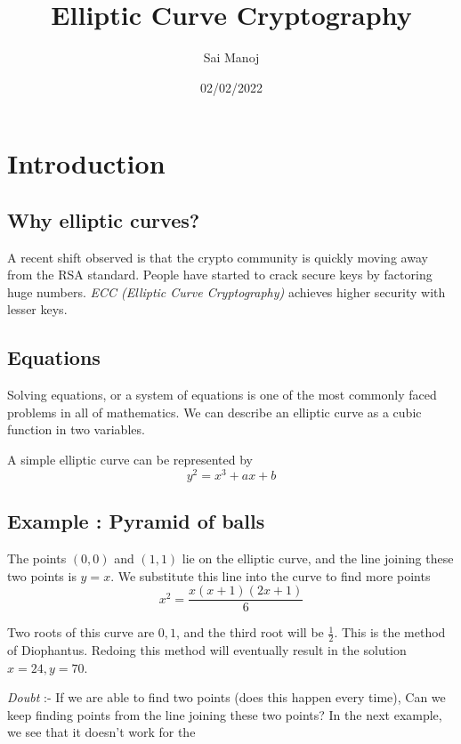 \documentclass[12pt]{article}
\title{Elliptic Curve Cryptography}
\author{Sai Manoj}
\date{02/02/2022}
\begin{document}
\maketitle

\section{Introduction}
\subsection{Why elliptic curves?}

A recent shift observed is that the crypto community is quickly moving away from the RSA standard. People have started to crack secure keys by factoring huge numbers. 
\emph{ECC (Elliptic Curve Cryptography)} achieves higher security with lesser keys. 

\subsection{Equations}

Solving equations, or a system of equations is one of the most commonly faced problems 
in all of mathematics. We can describe an elliptic curve as a cubic function in two variables. 

A simple elliptic curve can be represented by \begin{equation*}
    y^2 = x^3 + ax + b
\end{equation*} 

\subsection{Example : Pyramid of balls}
The points $(0,0)$ and $(1,1)$ lie on the elliptic curve, and the line joining these two points is $y=x$. We substitute this line into the curve to find more points \begin{equation*}
    x^2 = \frac{x(x+1)(2x+1)}{6}
\end{equation*}

Two roots of this curve are $0, 1$, and the third root 
will be $\frac{1}{2}$. 
This is the method of Diophantus. Redoing this method will eventually result in the solution $x = 24, y = 70$. 

\emph{Doubt} :- If we are able to find two points (does this happen every time), Can we keep finding points from the line joining these two points? In the next example, we see that it doesn't work for the 
\end{document}

